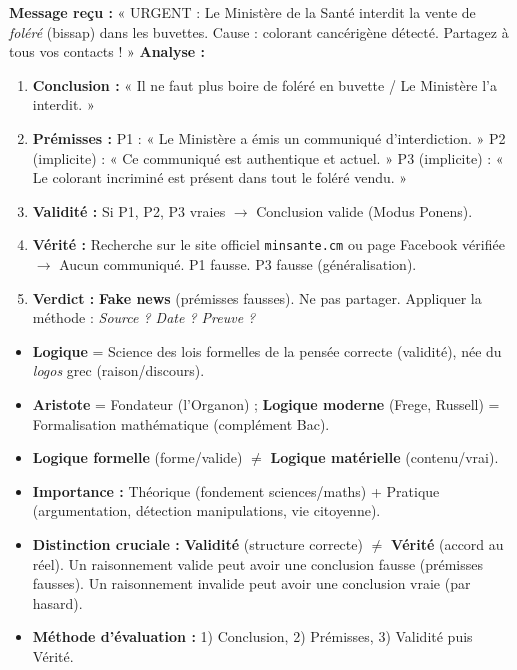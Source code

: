 \documentclass[11pt]{article}
\newcounter{popsec}
\newcounter{popsub}
\newcommand{\courssub}[1]{%
  \stepcounter{popsub}%
  \par\vspace{9pt}\noindent{\popxbold\fontsize{11.5}{13}\selectfont\color{popink}{\color{poporange}\thepopsec.\thepopsub}\hspace{6pt}#1}\par\nopagebreak\vspace{4pt}
}
\begin{document}
\begin{exoresolu}
\textbf{Message reçu :} « URGENT : Le Ministère de la Santé interdit la vente de \emph{foléré} (bissap) dans les buvettes. Cause : colorant cancérigène détecté. Partagez à tous vos contacts ! »
\textbf{Analyse :}
\begin{enumerate}
    \item \textbf{Conclusion :} « Il ne faut plus boire de foléré en buvette / Le Ministère l'a interdit. »
    \item \textbf{Prémisses :} P1 : « Le Ministère a émis un communiqué d'interdiction. » P2 (implicite) : « Ce communiqué est authentique et actuel. » P3 (implicite) : « Le colorant incriminé est présent dans tout le foléré vendu. »
    \item \textbf{Validité :} Si P1, P2, P3 vraies $\to$ Conclusion valide (Modus Ponens).
    \item \textbf{Vérité :} Recherche sur le site officiel \texttt{minsante.cm} ou page Facebook vérifiée $\to$ Aucun communiqué. P1 fausse. P3 fausse (généralisation).
    \item \textbf{Verdict :} \textbf{Fake news} (prémisses fausses). Ne pas partager. Appliquer la méthode : \emph{Source ? Date ? Preuve ?}
\end{enumerate}
\end{exoresolu}

\courssub{Synthèse de la section}

\begin{aretenir}
\begin{itemize}
    \item \textbf{Logique} = Science des lois formelles de la pensée correcte (validité), née du \emph{logos} grec (raison/discours).
    \item \textbf{Aristote} = Fondateur (l'Organon) ; \textbf{Logique moderne} (Frege, Russell) = Formalisation mathématique (complément Bac).
    \item \textbf{Logique formelle} (forme/valide) $\neq$ \textbf{Logique matérielle} (contenu/vrai).
    \item \textbf{Importance :} Théorique (fondement sciences/maths) + Pratique (argumentation, détection manipulations, vie citoyenne).
    \item \textbf{Distinction cruciale :} \textbf{Validité} (structure correcte) $\neq$ \textbf{Vérité} (accord au réel). Un raisonnement valide peut avoir une conclusion fausse (prémisses fausses). Un raisonnement invalide peut avoir une conclusion vraie (par hasard).
    \item \textbf{Méthode d'évaluation :} 1) Conclusion, 2) Prémisses, 3) Validité puis Vérité.
\end{itemize}
\end{aretenir}
\end{document}
